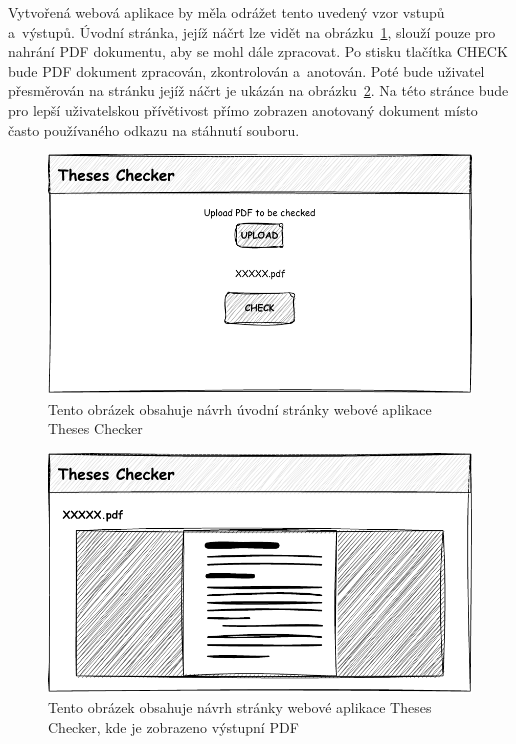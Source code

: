 Vytvořená webová aplikace by měla odrážet tento uvedený vzor vstupů a~výstupů.
Úvodní stránka, jejíž náčrt lze vidět na
obrázku~\ref{pic_theses_checker_design_page1}, slouží pouze pro nahrání
PDF dokumentu, aby se mohl dále zpracovat. Po stisku tlačítka CHECK bude
PDF dokument zpracován, zkontrolován a~anotován. Poté bude uživatel přesměrován na
stránku jejíž náčrt je ukázán na obrázku~\ref{pic_theses_checker_design_page2}.
Na této stránce bude pro lepší uživatelskou přívětivost přímo zobrazen
anotovaný dokument místo často používaného odkazu na stáhnutí souboru.

\begin{figure}[H]
    \centering
    \includegraphics[width=0.8\linewidth]{obrazky-figures/Theses_Checker_design-page1.pdf}
    \caption{
        Tento obrázek obsahuje návrh úvodní stránky webové aplikace Theses Checker
    }
    \label{pic_theses_checker_design_page1}
\end{figure}

\begin{figure}[H]
    \centering
    \includegraphics[width=0.8\linewidth]{obrazky-figures/Theses_Checker_design-page2.pdf}
    \caption{
        Tento obrázek obsahuje návrh stránky webové aplikace Theses Checker, kde
        je zobrazeno výstupní PDF
    }
    \label{pic_theses_checker_design_page2}
\end{figure}

